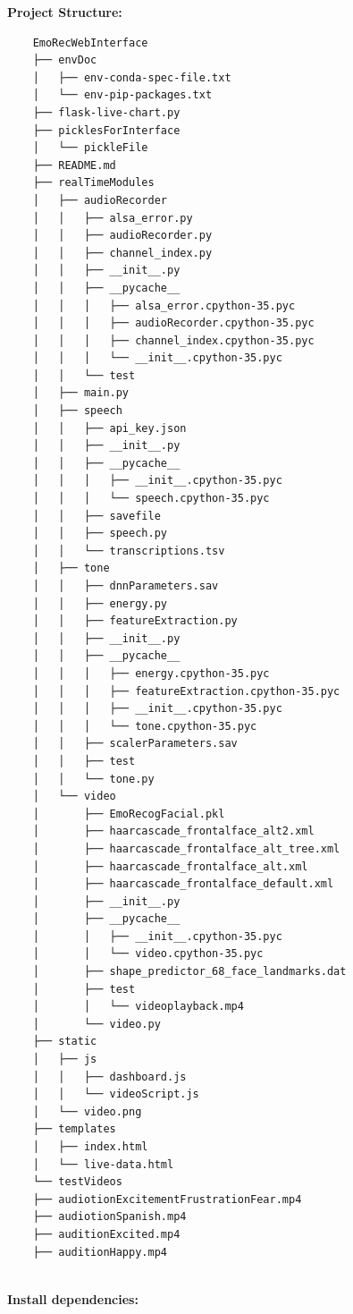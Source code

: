 \documentclass[oneside,a4paper,12pt]{report}
\begin{document}
\begin{normalsize}
\begin{itemize}
    \textbf{Project Structure:}
    \begin{verbatim}
    EmoRecWebInterface 
    ├── envDoc 
    │   ├── env-conda-spec-file.txt 
    │   └── env-pip-packages.txt 
    ├── flask-live-chart.py 
    ├── picklesForInterface 
    │   └── pickleFile 
    ├── README.md 
    ├── realTimeModules 
    │   ├── audioRecorder 
    │   │   ├── alsa_error.py 
    │   │   ├── audioRecorder.py 
    │   │   ├── channel_index.py 
    │   │   ├── __init__.py 
    │   │   ├── __pycache__ 
    │   │   │   ├── alsa_error.cpython-35.pyc 
    │   │   │   ├── audioRecorder.cpython-35.pyc 
    │   │   │   ├── channel_index.cpython-35.pyc 
    │   │   │   └── __init__.cpython-35.pyc 
    │   │   └── test 
    │   ├── main.py 
    │   ├── speech 
    │   │   ├── api_key.json 
    │   │   ├── __init__.py 
    │   │   ├── __pycache__ 
    │   │   │   ├── __init__.cpython-35.pyc 
    │   │   │   └── speech.cpython-35.pyc 
    │   │   ├── savefile 
    │   │   ├── speech.py 
    │   │   └── transcriptions.tsv 
    │   ├── tone 
    │   │   ├── dnnParameters.sav 
    │   │   ├── energy.py 
    │   │   ├── featureExtraction.py 
    │   │   ├── __init__.py 
    │   │   ├── __pycache__ 
    │   │   │   ├── energy.cpython-35.pyc 
    │   │   │   ├── featureExtraction.cpython-35.pyc 
    │   │   │   ├── __init__.cpython-35.pyc 
    │   │   │   └── tone.cpython-35.pyc 
    │   │   ├── scalerParameters.sav 
    │   │   ├── test 
    │   │   └── tone.py 
    │   └── video 
    │       ├── EmoRecogFacial.pkl 
    │       ├── haarcascade_frontalface_alt2.xml 
    │       ├── haarcascade_frontalface_alt_tree.xml 
    │       ├── haarcascade_frontalface_alt.xml 
    │       ├── haarcascade_frontalface_default.xml 
    │       ├── __init__.py 
    │       ├── __pycache__ 
    │       │   ├── __init__.cpython-35.pyc 
    │       │   └── video.cpython-35.pyc 
    │       ├── shape_predictor_68_face_landmarks.dat 
    │       ├── test 
    │       │   └── videoplayback.mp4 
    │       └── video.py 
    ├── static 
    │   ├── js 
    │   │   ├── dashboard.js 
    │   │   └── videoScript.js 
    │   └── video.png 
    ├── templates 
    │   ├── index.html 
    │   └── live-data.html 
    └── testVideos 
    ├── audiotionExcitementFrustrationFear.mp4 
    ├── audiotionSpanish.mp4 
    ├── auditionExcited.mp4 
    ├── auditionHappy.mp4
    
    \end{verbatim}
    
    \vspace{10mm}
    \textbf{Install dependencies:}
    \begin{itemize}
    	

\end{itemize}
\end{itemize}
\end{normalsize}
\end{document}
